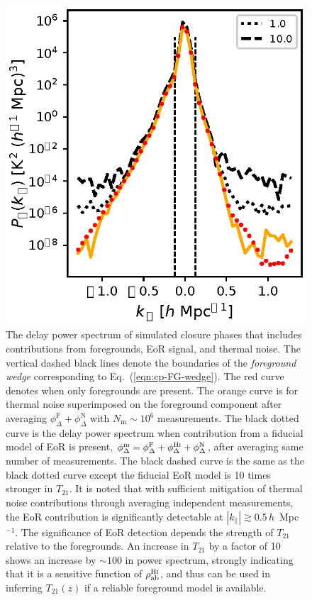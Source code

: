 \documentclass[
reprint,
superscriptaddress,
amsmath,
amssymb,
aps,
prd
]{revtex4-1}
\begin{document}
\begin{figure}[htb]
\includegraphics[width=0.85\linewidth]{cpdps_150MHz_nsamples_1048576}
\caption{The delay power spectrum of simulated closure phases that includes contributions from foregrounds, EoR signal, and thermal noise. The vertical dashed black lines denote the boundaries of the {\it foreground wedge} corresponding to Eq.~(\ref{eqn:cp-FG-wedge}). The red curve denotes when only foregrounds are present. The orange curve is for thermal noise superimposed on the foreground component after averaging $\phi_\Delta^\textrm{F}+\phi_\Delta^\textrm{N}$ with $N_\textrm{m} \sim 10^6$ measurements. The black dotted curve is the delay power spectrum when contribution from a fiducial model of EoR is present, $\phi_\Delta^\textrm{m}=\phi_\Delta^\textrm{F}+\phi_\Delta^\textrm{H{\sc i}}+\phi_\Delta^\textrm{N}$, after averaging same number of measurements. The black dashed curve is the same as the black dotted curve except the fiducial EoR model is 10 times stronger in $T_{21}$. It is noted that with sufficient mitigation of thermal noise contributions through averaging independent measurements, the EoR contribution is significantly detectable at $|k_\parallel| \gtrsim 0.5\,h$~Mpc$^{-1}$. The significance of EoR detection depends the strength of $T_{21}$ relative to the foregrounds. An increase in $T_{21}$ by a factor of 10 shows an increase by $\sim 100$ in power spectrum, strongly indicating that it is a sensitive function of $\rho_\textrm{ab}^\textrm{H{\sc i}}$, and thus can be used in inferring $T_{21}(z)$ if a reliable foreground model is available. \label{fig:cpdps}}
\end{figure}
\end{document}
